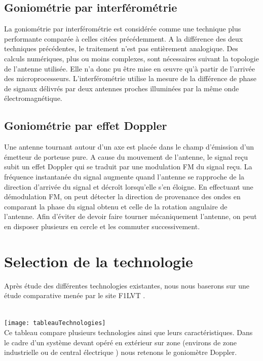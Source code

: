 \subsection{Goniométrie par interférométrie}

	La goniométrie par interférométrie est considérée comme une technique plus performante comparée à celles citées précédemment. A la différence des deux techniques précédentes, le traitement n’est pas entièrement analogique. Des calculs numériques, plus ou moins complexes, sont nécessaires suivant la topologie de l’antenne utilisée. Elle n’a donc pu être mise en œuvre qu’à partir de l’arrivée des microprocesseurs.
L’interférométrie utilise la mesure de la différence de phase de signaux délivrés par deux antennes proches illuminées par la même onde électromagnétique.

\subsection{Goniométrie par effet Doppler}

	Une antenne tournant autour d'un axe est placée dans le champ d'émission d'un émetteur de porteuse pure. A cause du mouvement de l'antenne, le signal reçu subit un effet Doppler qui se traduit par une modulation FM du signal reçu. La fréquence instantanée du signal augmente quand l’antenne se rapproche de la direction d’arrivée du signal et décroît lorsqu’elle s’en éloigne. En effectuant une démodulation FM, on peut détecter la direction de provenance des ondes en comparant la phase du signal obtenu et celle de la rotation angulaire de l’antenne. 
Afin d'éviter de devoir faire tourner mécaniquement l'antenne, on peut en disposer plusieurs en cercle et les commuter successivement.

\section{Selection de la technologie}

	Après étude des différentes technologies existantes, nous nous baserons sur une étude comparative menée par le site F1LVT \cite{montreal}.

~\\	
	\texttt{[image: tableauTechnologies]}
\parindent=15pt
~\\

	Ce tableau compare plusieurs technologies ainsi que leurs caractéristiques. Dans le cadre d’un système devant opéré en extérieur sur zone (environs de zone industrielle ou de central électrique ) nous retenons le goniomètre Doppler.

